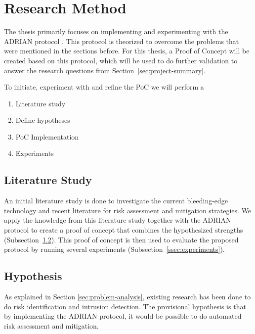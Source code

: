 \section{Research Method}
The thesis primarily focuses on implementing and experimenting with the ADRIAN protocol \cite{mann2023ADRIAN}. This protocol is theorized to overcome the problems that were mentioned in the sections before. For this thesis, a Proof of Concept will be created based on this protocol, which will be used to do further validation to answer the research questions from Section~\ref{sec:project-summary}. 

To initiate, experiment with and refine the PoC we will perform a 
\begin{enumerate}
    \item Literature study
    \item Define hypotheses
    \item PoC Implementation
    \item Experiments
\end{enumerate}

\subsection{Literature Study}
An initial literature study is done to investigate the current bleeding-edge technology and recent literature for risk assessment and mitigation strategies. We apply the knowledge from this literature study together with the ADRIAN protocol to create a proof of concept that combines the hypothesized strengths (Subsection~\ref{ssec:hypothesis}). This proof of concept is then used to evaluate the proposed protocol by running several experiments (Subsection~\ref{ssec:experiments}).

\subsection{Hypothesis} \label{ssec:hypothesis}
As explained in Section \ref{sec:problem-analysis}, existing research has been done to do risk identification and intrusion detection. The provisional hypothesis is that by implementing the ADRIAN protocol, it would be possible to do automated risk assessment and mitigation.

